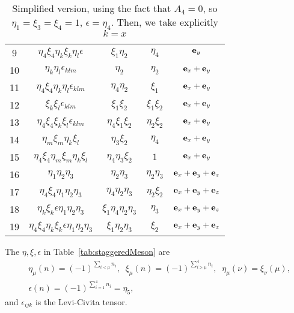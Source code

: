 \begin{table}
\begin{center}
\begin{tabular}{c|c|c|c|c}
9  & $\eta_4\xi_4\eta_k\xi_k\eta_l\epsilon$      & $\xi_1\eta_2$                   & $\eta_4$       & ${\bf e}_y$                     \\
10 & $\eta _k\eta _l \epsilon _{klm}$            & $\eta _2 $                      & $\eta _2$      & ${\bf e}_x+{\bf e}_y$           \\
11 & $\eta_4\xi_4\eta _k\eta _l \epsilon _{klm}$ & $\eta_4\eta _2$                 & $\xi _1$       & ${\bf e}_x+{\bf e}_y$           \\
12 & $\xi _k\xi _l \epsilon _{klm}$              & $\xi _1\xi _2$                  & $\xi_1\xi_2$   & ${\bf e}_x+{\bf e}_y$           \\
13 & $\eta_4\xi_4\xi _k\xi _l \epsilon _{klm}$   & $\eta_4\xi _1\xi _2$            & $\eta_2\xi_2$  & ${\bf e}_x+{\bf e}_y$           \\
14 & $\eta _m\xi _m\eta _k\xi _l$                & $\eta _3\xi _2$                 & $\eta_4$       & ${\bf e}_x+{\bf e}_y$           \\
15 & $\eta_4\xi_4\eta _m\xi _m\eta _k\xi _l$     & $\eta_4\eta _3\xi _2$           & $1$            & ${\bf e}_x+{\bf e}_y$           \\
16 & $\eta _1\eta _2\eta _3$                     & $\eta _2\eta _3$                & $\eta_2\eta_3$ & ${\bf e}_x+{\bf e}_y+{\bf e}_z$ \\
17 & $\eta_4\xi_4\eta _1\eta _2\eta _3$          & $\eta_4\eta _2\eta _3$          & $\eta_2\xi_2$  & ${\bf e}_x+{\bf e}_y+{\bf e}_z$ \\
18 & $\eta_k\xi_k\epsilon\eta _1\eta _2\eta _3$  & $\xi_1\eta_4\eta _2\eta _3$     & $\eta _3$      & ${\bf e}_x+{\bf e}_y+{\bf e}_z$ \\
19 & $\eta_4\xi_4\eta_k\xi_k\epsilon\eta _1\eta _2\eta _3$ & $\xi_1\eta _2\eta _3$ & $\xi _2$       & ${\bf e}_x+{\bf e}_y+{\bf e}_z$ \\
\hline
\end{tabular}
\end{center}
\caption{\label{tab:staggeredMeson2}Simplified version, using the fact that $A_4=0$, so $\eta _1=\xi _3=\xi _4=1$, $\epsilon = \eta _4$. Then, we take explicitly $k=x$}
\end{table}

The $\eta,\xi,\epsilon$ in Table~\ref{tab:staggeredMeson} are
\begin{equation}
\begin{split}
&\eta_{\mu}(n)=(-1)^{\sum _{i<\mu} n_i},\;\;\xi _{\mu}(n)=(-1)^{\sum _{i\geq \mu}^4 n_i},\;\;\eta _{\mu}(\nu)=\xi _{\nu}(\mu),\\
&\epsilon (n) = (-1)^{\sum _{i=1}^4 n_i}=\eta _5,
\end{split}
\end{equation}
and $\epsilon _{ijk}$ is the Levi-Civita tensor.

